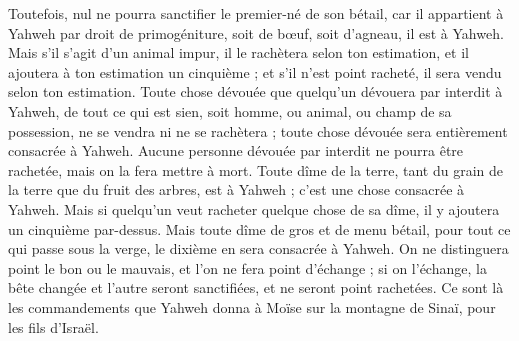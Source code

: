 \begin{multicols}{2}
Toutefois, nul ne pourra sanctifier le premier-né de son bétail, car il appartient à Yahweh par droit de primogéniture, soit de bœuf, soit d'agneau, il est à Yahweh.
Mais s'il s'agit d'un animal impur, il le rachètera selon ton estimation, et il ajoutera à ton estimation un cinquième ; et s'il n'est point racheté, il sera vendu selon ton estimation.
Toute chose dévouée que quelqu'un dévouera par interdit à Yahweh, de tout ce qui est sien, soit homme, ou animal, ou champ de sa possession, ne se vendra ni ne se rachètera ; toute chose dévouée sera entièrement consacrée à Yahweh.
Aucune personne dévouée par interdit ne pourra être rachetée, mais on la fera mettre à mort.
Toute dîme de la terre, tant du grain de la terre que du fruit des arbres, est à Yahweh ; c'est une chose consacrée à Yahweh.
Mais si quelqu'un veut racheter quelque chose de sa dîme, il y ajoutera un cinquième par-dessus.
Mais toute dîme de gros et de menu bétail, pour tout ce qui passe sous la verge, le dixième en sera consacrée à Yahweh.
On ne distinguera point le bon ou le mauvais, et l'on ne fera point d'échange ; si on l'échange, la bête changée et l'autre seront sanctifiées, et ne seront point rachetées.
Ce sont là les commandements que Yahweh donna à Moïse sur la montagne de Sinaï, pour les fils d'Israël.
\PPE{}
\end{multicols}
